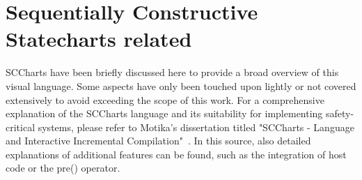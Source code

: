 \section{Sequentially Constructive Statecharts related}
SCCharts have been briefly discussed here to provide a broad overview of this visual language. Some aspects have only been touched upon lightly or not covered extensively to avoid exceeding the scope of this work. For a comprehensive explanation of the SCCharts language and its suitability for implementing safety-critical systems, please refer to Motika's dissertation titled "SCCharts - Language and Interactive Incremental Compilation"~\cite{Motika.2017}. In this source, also detailed explanations of additional features can be found, such as the integration of host code or the pre() operator.